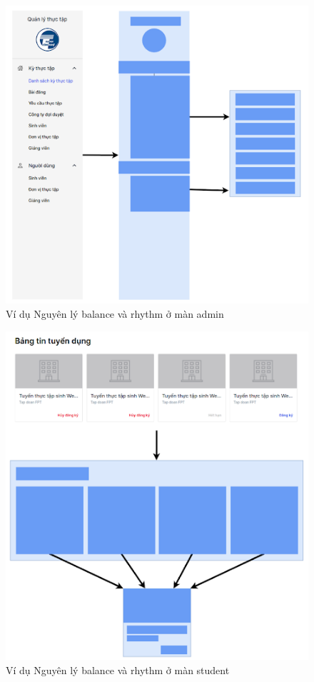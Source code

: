 \documentclass[./../main.tex]{subfiles}
\begin{document}
\begin{figure}[H]
	\includegraphics[width=\linewidth]{./images/image33.png}
	\caption{Ví dụ Nguyên lý balance và rhythm ở màn admin}
	\label{fig:example_rhythm_admin}
\end{figure}

\begin{figure}[H]
	\includegraphics[width=\linewidth]{./images/image34.png}
	\caption{Ví dụ Nguyên lý balance và rhythm ở màn student}
	\label{fig:example_rhythm_syudent}
\end{figure}
\end{document}
